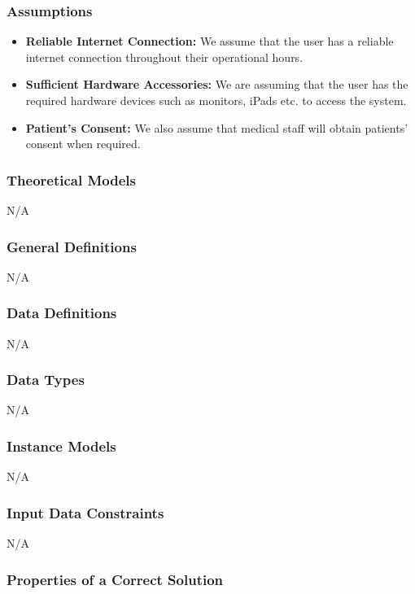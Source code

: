 \documentclass[12pt]{article}
\begin{document}
\subsubsection{Assumptions} \label{sec_assumpt}

\begin{itemize}
  \item\textbf{Reliable Internet Connection:} We assume that the user has a reliable internet connection throughout their operational hours.
  \item\textbf{Sufficient Hardware Accessories:} We are assuming that the user has the required hardware devices such as monitors, iPads etc. to access the system.
  \item\textbf{Patient’s Consent:} We also assume that medical staff will obtain patients’ consent when required.
\end{itemize}


\subsubsection{Theoretical Models}\label{sec_theoretical}
N/A

\subsubsection{General Definitions} \label{sec_GeneralDefinitions}
N/A

\subsubsection{Data Definitions}\label{sec_DataDefinitions} 
N/A

\subsubsection{Data Types}\label{sec_DataTypes}
N/A

\subsubsection{Instance Models} \label{sec_InstanceModels} 
N/A

\subsubsection{Input Data Constraints} \label{sec_InputDataConstraints}
N/A


\subsubsection{Properties of a Correct Solution} \label{sec_CorrectSolution}
\end{document}
